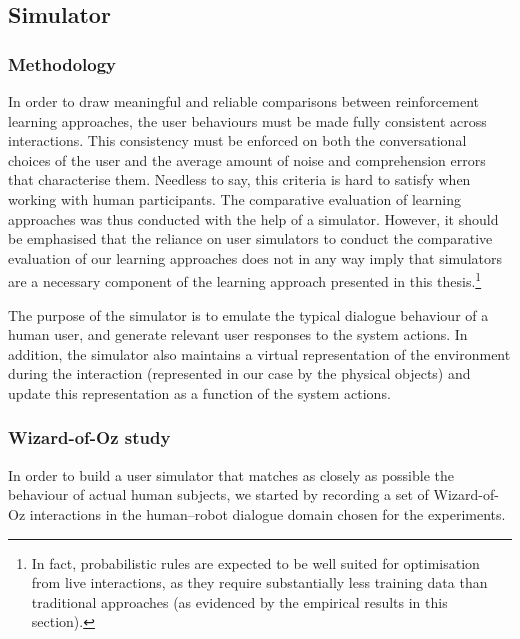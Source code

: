 \subsection{Simulator}

\subsubsection*{Methodology}

In order to draw meaningful and reliable comparisons between reinforcement learning approaches, the user behaviours must be made fully consistent across interactions.  This consistency must be enforced on both the conversational choices of the user and the average amount of noise and comprehension errors that characterise them. Needless to say, this criteria is hard to satisfy when working with human participants. The comparative evaluation of learning approaches was thus conducted with the help of a simulator. However, it should be emphasised that the reliance on user simulators to conduct the comparative evaluation of our learning approaches does not in any way imply that simulators are a necessary component of the learning approach presented in this thesis.\footnote{In fact, probabilistic rules are expected to be well suited for optimisation from live interactions, as they require substantially less training data than traditional approaches (as evidenced by the empirical results in this section).}

The purpose of the simulator is to emulate the typical dialogue behaviour of a human user, and generate relevant user responses to the system actions.  In addition, the simulator also maintains a virtual representation of the environment during the interaction (represented in our case by the physical objects) and update this representation as a function of the system actions.


\subsubsection*{Wizard-of-Oz study}

In order to build a user simulator that matches as closely as possible the behaviour of actual human subjects, we started by recording a set of Wizard-of-Oz interactions in the human--robot dialogue domain chosen for the experiments. 


